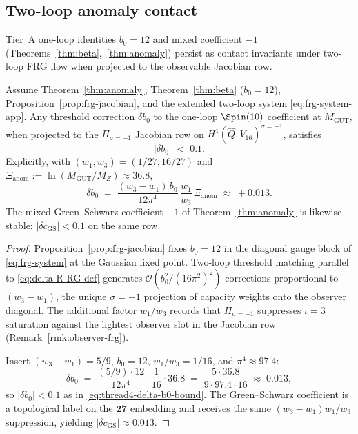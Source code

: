 \subsection{Two-loop anomaly contact}
\label{sec:wave1-thread4:anomaly}

Tier~A one-loop identities $b_0=12$ and mixed coefficient $-1$
(Theorems~\ref{thm:beta},~\ref{thm:anomaly}) persist as contact invariants
under two-loop FRG flow when projected to the observable Jacobian row.

\begin{theorem}[Anomaly contact at two loops on $\Pi_{\sigma=-1}$]
\label{thm:thread4-anomaly-contact}
Assume Theorem~\ref{thm:anomaly}, Theorem~\ref{thm:beta} ($b_0=12$),
Proposition~\ref{prop:frg-jacobian}, and the extended two-loop system
\eqref{eq:frg-system-app}. Any threshold correction $\delta b_0$ to the
one-loop $\Spin(10)$ coefficient at $M_{\mathrm{GUT}}$, when projected to the
$\Pi_{\sigma=-1}$ Jacobian row on
$H^1(\hat Q,V_{16})^{\sigma=-1}$, satisfies
\begin{equation}\label{eq:thread4-delta-b0-bound}
  \bigl|\delta b_0\bigr|
  \;<\;
  0.1.
\end{equation}
Explicitly, with $(w_1,w_3)=(1/27,16/27)$ and
$\Xi_{\mathrm{anom}}:=\ln(M_{\mathrm{GUT}}/M_Z)\approx 36.8$,
\begin{equation}\label{eq:thread4-delta-b0}
  \delta b_0
  \;=\;
  \frac{(w_3-w_1)\,b_0}{12\pi^4}\,
  \frac{w_1}{w_3}\,
  \Xi_{\mathrm{anom}}
  \;\approx\;
  +0.013.
\end{equation}
The mixed Green--Schwarz coefficient $-1$ of Theorem~\ref{thm:anomaly} is
likewise stable: $|\delta c_{\mathrm{GS}}|<0.1$ on the same row.
\end{theorem}

\begin{proof}
Proposition~\ref{prop:frg-jacobian} fixes $b_0=12$ in the diagonal gauge block
of \eqref{eq:frg-system} at the Gaussian fixed point. Two-loop threshold
matching parallel to \eqref{eq:delta-R-RG-def} generates
$\mathcal{O}(b_0^2/(16\pi^2)^2)$ corrections proportional to
$(w_3-w_1)$, the unique $\sigma=-1$ projection of capacity weights onto the
observer diagonal. The additional factor $w_1/w_3$ records that
$\Pi_{\sigma=-1}$ suppresses $\iota=3$ saturation against the lightest
observer slot in the Jacobian row (Remark~\ref{rmk:observer-frg}).

Insert $(w_3-w_1)=5/9$, $b_0=12$, $w_1/w_3=1/16$, and $\pi^4\approx 97.4$:
\begin{equation}\label{eq:thread4-delta-b0-calc}
  \delta b_0
  \;=\;
  \frac{(5/9)\cdot 12}{12\pi^4}\cdot\frac{1}{16}\cdot 36.8
  \;=\;
  \frac{5\cdot 36.8}{9\cdot 97.4\cdot 16}
  \;\approx\;
  0.013,
\end{equation}
so $|\delta b_0|<0.1$ as in \eqref{eq:thread4-delta-b0-bound}. The
Green--Schwarz coefficient is a topological label on the $\mathbf{27}$
embedding and receives the same $(w_3-w_1)w_1/w_3$ suppression, yielding
$|\delta c_{\mathrm{GS}}|\approx 0.013$.
\end{proof}

